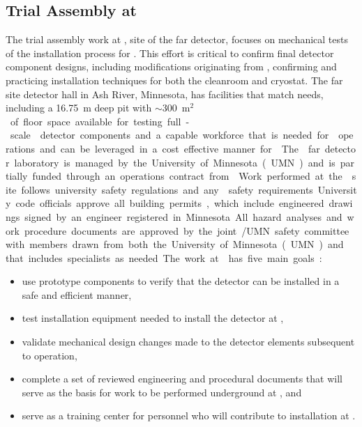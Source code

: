 \subsection{Trial Assembly at }

The trial assembly work at , site of the 
far detector, focuses on mechanical tests of the installation
process for . This effort is critical to confirm final
detector component designs, including modifications originating from
, confirming and practicing installation techniques
for both the cleanroom and cryostat.  The  far site
detector hall in Ash River, Minnesota, has facilities that
match  needs, including a \SI{16.75}{m} deep pit with
$\sim$\SI{300}{m$^2$} of floor space available for testing full-scale
 detector components and a capable workforce that is
needed for  operations and can be leveraged in a cost effective
manner for .  The  far detector laboratory is
managed by the University of Minnesota (UMN) and is partially funded
through an operations contract from .  Work performed at
the  site follows university safety regulations and
any  safety requirements. University code officials approve
all building permits, which include engineered drawings signed by an
engineer registered in Minnesota. All hazard analyses and work
procedure documents are approved by the joint /UMN safety
committee with members drawn from both the University of Minnesota
(UMN) and  that includes specialists as needed.

The work at  has five main goals:
\begin{itemize}
  \item use prototype  components to verify that the
    detector can be installed in a safe and efficient
    manner,
    \item test installation equipment needed to install the
       detector at ,
  \item validate mechanical design changes made to the detector
    elements subsequent to  operation,
  \item complete a set of reviewed engineering and procedural
    documents that will serve as the basis for work to be performed
    underground at , and
  \item serve as a training center for personnel who will 
    contribute to   installation at .
\end{itemize}

